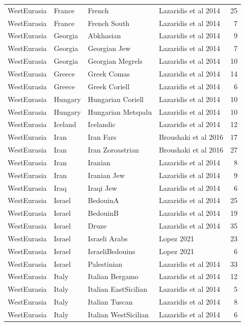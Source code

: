 \begin{longtable}[t]{lll>{\raggedright\arraybackslash}p{9em}r}
\addlinespace
WestEurasia & France & French & Lazaridis et al 2014 & 25\\
WestEurasia & France & French South & Lazaridis et al 2014 & 7\\
WestEurasia & Georgia & Abkhasian & Lazaridis et al 2014 & 9\\
WestEurasia & Georgia & Georgian Jew & Lazaridis et al 2014 & 7\\
WestEurasia & Georgia & Georgian Megrels & Lazaridis et al 2014 & 10\\
\addlinespace
WestEurasia & Greece & Greek Comas & Lazaridis et al 2014 & 14\\
WestEurasia & Greece & Greek Coriell & Lazaridis et al 2014 & 6\\
WestEurasia & Hungary & Hungarian Coriell & Lazaridis et al 2014 & 10\\
WestEurasia & Hungary & Hungarian Metspalu & Lazaridis et al 2014 & 10\\
WestEurasia & Iceland & Icelandic & Lazaridis et al 2014 & 12\\
\addlinespace
WestEurasia & Iran & Iran Fars & Broushaki et al 2016 & 17\\
WestEurasia & Iran & Iran Zoroastrian & Broushaki et al 2016 & 27\\
WestEurasia & Iran & Iranian & Lazaridis et al 2014 & 8\\
WestEurasia & Iran & Iranian Jew & Lazaridis et al 2014 & 9\\
WestEurasia & Iraq & Iraqi Jew & Lazaridis et al 2014 & 6\\
\addlinespace
WestEurasia & Israel & BedouinA & Lazaridis et al 2014 & 25\\
WestEurasia & Israel & BedouinB & Lazaridis et al 2014 & 19\\
WestEurasia & Israel & Druze & Lazaridis et al 2014 & 35\\
WestEurasia & Israel & Israeli Arabs & Lopez 2021 & 23\\
WestEurasia & Israel & IsraeliBedouins & Lopez 2021 & 6\\
\addlinespace
WestEurasia & Israel & Palestinian & Lazaridis et al 2014 & 33\\
WestEurasia & Italy & Italian Bergamo & Lazaridis et al 2014 & 12\\
WestEurasia & Italy & Italian EastSicilian & Lazaridis et al 2014 & 5\\
WestEurasia & Italy & Italian Tuscan & Lazaridis et al 2014 & 8\\
WestEurasia & Italy & Italian WestSicilian & Lazaridis et al 2014 & 6\\

\end{longtable}
